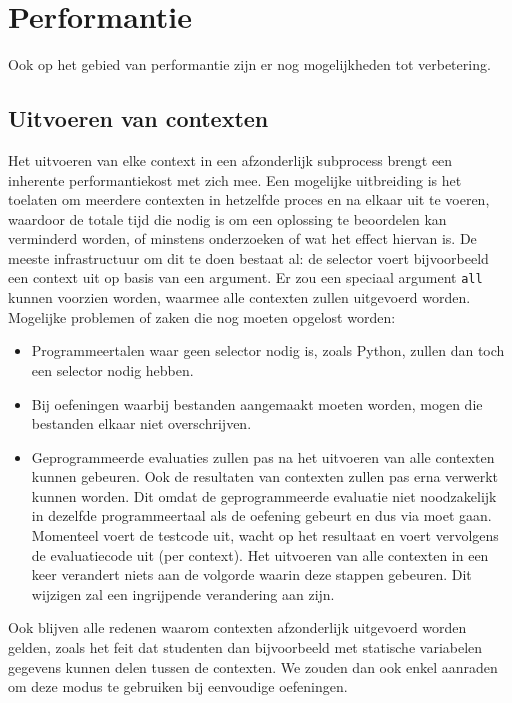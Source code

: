 \section{Performantie}\label{sec:future-performantie}

Ook op het gebied van performantie zijn er nog mogelijkheden tot verbetering.

\subsection{Uitvoeren van contexten}\label{subsec:future-performance}

Het uitvoeren van elke context in een afzonderlijk subprocess brengt een inherente performantiekost met zich mee.
Een mogelijke uitbreiding is het toelaten om meerdere contexten in hetzelfde proces en na elkaar uit te voeren, waardoor de totale tijd die nodig is om een oplossing te beoordelen kan verminderd worden, of minstens onderzoeken of wat het effect hiervan is.
De meeste infrastructuur om dit te doen bestaat al: de selector voert bijvoorbeeld een context uit op basis van een argument.
Er zou een speciaal argument \texttt{all} kunnen voorzien worden, waarmee alle contexten zullen uitgevoerd worden.
Mogelijke problemen of zaken die nog moeten opgelost worden:

\begin{itemize}
    \item Programmeertalen waar geen selector nodig is, zoals Python, zullen dan toch een selector nodig hebben.
    \item Bij oefeningen waarbij bestanden aangemaakt moeten worden, mogen die bestanden elkaar niet overschrijven.
    \item Geprogrammeerde evaluaties zullen pas na het uitvoeren van alle contexten kunnen gebeuren.
    Ook de resultaten van contexten zullen pas erna verwerkt kunnen worden.
    Dit omdat de geprogrammeerde evaluatie niet noodzakelijk in dezelfde programmeertaal als de oefening gebeurt en dus via \tested{} moet gaan.
    Momenteel voert \tested{} de testcode uit, wacht op het resultaat en voert vervolgens de evaluatiecode uit (per context).
    Het uitvoeren van alle contexten in een keer verandert niets aan de volgorde waarin deze stappen gebeuren.
    Dit wijzigen zal een ingrijpende verandering aan \tested{} zijn.
\end{itemize}

Ook blijven alle redenen waarom contexten afzonderlijk uitgevoerd worden gelden, zoals het feit dat studenten dan bijvoorbeeld met statische variabelen gegevens kunnen delen tussen de contexten.
We zouden dan ook enkel aanraden om deze modus te gebruiken bij eenvoudige oefeningen.

